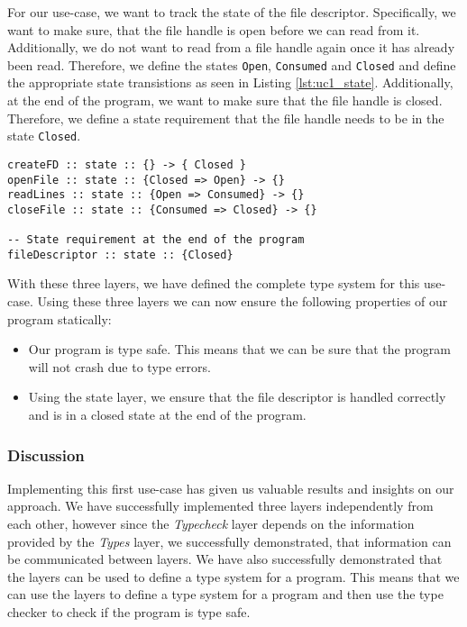 For our use-case, we want to track the state of the file descriptor. Specifically, we want to make sure, that the file handle is open before we can read from it. Additionally, we do not want to read from a file handle again once it has already been read. Therefore, we define the states \texttt{Open}, \texttt{Consumed} and \texttt{Closed} and define the appropriate state transistions as seen in Listing \ref{lst:uc1_state}. Additionally, at the end of the program, we want to make sure that the file handle is closed. Therefore, we define a state requirement that the file handle needs to be in the state \texttt{Closed}.

\begin{lstlisting}
createFD :: state :: {} -> { Closed }
openFile :: state :: {Closed => Open} -> {}
readLines :: state :: {Open => Consumed} -> {}
closeFile :: state :: {Consumed => Closed} -> {}

-- State requirement at the end of the program
fileDescriptor :: state :: {Closed}
\end{lstlisting}

With these three layers, we have defined the complete type system for this use-case. Using these three layers we can now ensure the following properties of our program statically:

\begin{itemize}
	\item Our program is type safe. This means that we can be sure that the program will not crash due to type errors.
	\item Using the state layer, we ensure that the file descriptor is handled correctly and is in a closed state at the end of the program.
\end{itemize}

\subsubsection{Discussion}

Implementing this first use-case has given us valuable results and insights on our approach. We have successfully implemented three layers independently from each other, however since the \textit{Typecheck} layer depends on the information provided by the \textit{Types} layer, we successfully demonstrated, that information can be communicated between layers. We have also successfully demonstrated that the layers can be used to define a type system for a program. This means that we can use the layers to define a type system for a program and then use the type checker to check if the program is type safe.

